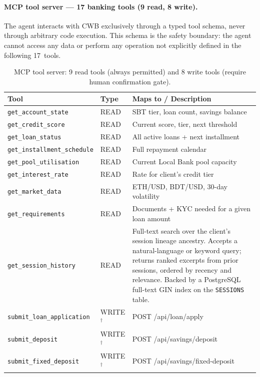 \documentclass[12pt,a4paper]{report}
\begin{document}
\paragraph{MCP tool server --- 17 banking tools (9 read, 8 write).}

The agent interacts with CWB exclusively through a typed tool schema, never through arbitrary code execution. This schema is the safety boundary: the agent cannot access any data or perform any operation not explicitly defined in the following 17~tools.

\begin{table}[H]
\centering
\caption{MCP tool server: 9 read tools (always permitted) and 8 write tools (require human confirmation gate).}
\label{tab:mcp-tools}
\small
\begin{tabular}{p{4.8cm}p{1.4cm}p{6.3cm}}
\hline
\textbf{Tool} & \textbf{Type} & \textbf{Maps to / Description} \\
\hline
\texttt{get\_account\_state}         & READ & SBT tier, loan count, savings balance \\
\texttt{get\_credit\_score}          & READ & Current score, tier, next threshold \\
\texttt{get\_loan\_status}           & READ & All active loans + next installment \\
\texttt{get\_installment\_schedule}  & READ & Full repayment calendar \\
\texttt{get\_pool\_utilisation}      & READ & Current Local Bank pool capacity \\
\texttt{get\_interest\_rate}         & READ & Rate for client's credit tier \\
\texttt{get\_market\_data}           & READ & ETH/USD, BDT/USD, 30-day volatility \\
\texttt{get\_requirements}           & READ & Documents + KYC needed for a given loan amount \\
\texttt{get\_session\_history}       & READ & Full-text search over the client's session lineage ancestry. Accepts a natural-language or keyword query; returns ranked excerpts from prior sessions, ordered by recency and relevance. Backed by a PostgreSQL full-text GIN index on the \texttt{SESSIONS} table. \\
\hline
\texttt{submit\_loan\_application}   & WRITE$^{\dagger}$ & POST /api/loan/apply \\
\texttt{submit\_deposit}             & WRITE$^{\dagger}$ & POST /api/savings/deposit \\
\texttt{submit\_fixed\_deposit}      & WRITE$^{\dagger}$ & POST /api/savings/fixed-deposit \\

\end{tabular}
\end{table}
\end{document}
